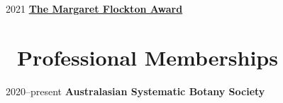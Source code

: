 \documentclass[10,a4paper,]{awesome-cv}
\begin{document}
2021
\href{https://www.rbgsyd.nsw.gov.au/Science/Botanical-Illustration/The-Margaret-Flockton-Award-21}{\textbf{The
Margaret Flockton Award}}

\hypertarget{professional-memberships}{%
\section{\texorpdfstring{\acvHeaderIconSep~Professional
Memberships}{~Professional Memberships}}\label{professional-memberships}}

2020--present \textbf{Australasian Systematic Botany Society}
\end{document}
